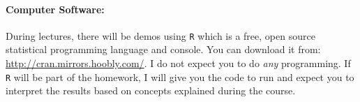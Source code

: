 \paragraph{Computer Software:} During lectures, there will be demos using \texttt{R} which is a free, open source statistical programming language and console. You can download it from: \url{http://cran.mirrors.hoobly.com/}. I do not expect you to do \textit{any} programming. If \texttt{R} will be part of the homework, I will give you the code to run and expect you to interpret the results based on concepts explained during the course.
